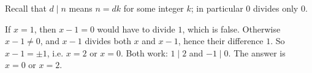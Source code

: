 Recall that $d\mid n$ means $n=dk$ for some integer $k$; in particular $0$ divides only $0$.

If $x=1$, then $x-1=0$ would have to divide $1$, which is false. Otherwise $x-1\ne0$, and $x-1$ divides both $x$ and $x-1$, hence their difference $1$. So $x-1=\pm1$, i.e. $x=2$ or $x=0$. Both work: $1\mid2$ and $-1\mid0$. The answer is $\boxed{x=0\text{ or }x=2}$.
